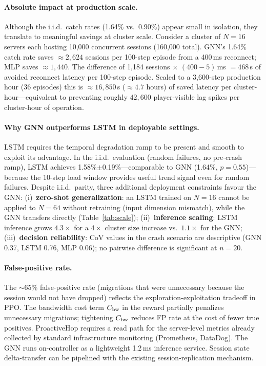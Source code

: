 \documentclass[review,1p]{elsarticle}
\theoremstyle{definition}
\begin{document}
\paragraph{Absolute impact at production scale.}
Although the i.i.d.\ catch rates (1.64\% vs.\ 0.90\%) appear small in
isolation, they translate to meaningful savings at cluster scale.
Consider a cluster of $N{=}16$ servers each hosting 10,000 concurrent
sessions (160,000 total).  GNN's 1.64\% catch rate saves
$\approx\!2{,}624$ sessions per 100-step episode from a 400\,ms reconnect;
MLP saves $\approx\!1{,}440$.  The difference of 1,184 sessions $\times$
$(400 - 5)$\,ms $= 468$\,s of avoided reconnect latency per 100-step episode.
Scaled to a 3,600-step production hour (36 episodes) this is $\approx\!16{,}850$\,s
(${\approx}4.7$ hours) of saved latency per cluster-hour---equivalent to preventing roughly
$42{,}600$ player-visible lag spikes per cluster-hour of operation.

\paragraph{Why GNN outperforms LSTM in deployable settings.}
LSTM requires the temporal degradation ramp to be present and smooth to
exploit its advantage.  In the i.i.d.\ evaluation (random failures,
no pre-crash ramp), LSTM achieves 1.58\%$\pm$0.19\%---comparable to
GNN (1.64\%, $p{=}0.55$)---because the 10-step load window provides
useful trend signal even for random failures.  Despite i.i.d.\ parity,
three additional deployment constraints favour the GNN:
(i)~\textbf{zero-shot generalization}: an LSTM trained on $N{=}16$
cannot be applied to $N{=}64$ without retraining (input dimension
mismatch), while the GNN transfers directly (Table~\ref{tab:scale});
(ii)~\textbf{inference scaling}: LSTM inference grows $4.3\times$ for a
$4\times$ cluster size increase vs.\ $1.1\times$ for the GNN;
(iii)~\textbf{decision reliability}: CoV values in the crash scenario are
descriptive (GNN 0.37, LSTM 0.76, MLP 0.06); no pairwise difference is
significant at $n{=}20$.

\paragraph{False-positive rate.}
The $\sim$65\% false-positive rate (migrations that were unnecessary because
the session would not have dropped) reflects the exploration-exploitation
tradeoff in PPO.  The bandwidth cost term $C_{\rm bw}$ in the reward
partially penalizes unnecessary migrations; tightening $C_{\rm bw}$
reduces FP rate at the cost of fewer true positives.
ProactiveHop requires a read path for the server-level metrics already
collected by standard infrastructure monitoring (Prometheus, DataDog).
The GNN runs on-controller as a lightweight 1.2\,ms inference service.
Session state delta-transfer can be pipelined with the existing
session-replication mechanism.
\end{document}
